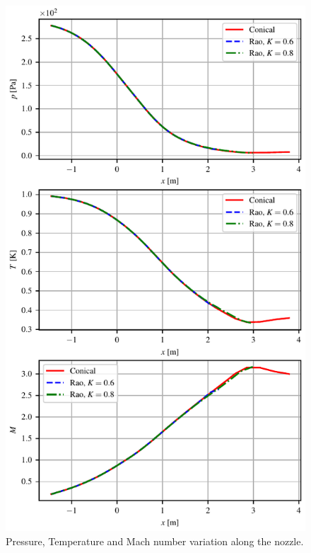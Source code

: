 \documentclass{article}
\begin{document}
\begin{figure}[htb]
    \centering
    \includegraphics[scale=1]{../plots/pTM_vs_x.pdf}
    \caption{Pressure, Temperature and Mach number variation along the nozzle.}
\end{figure}
\end{document}
